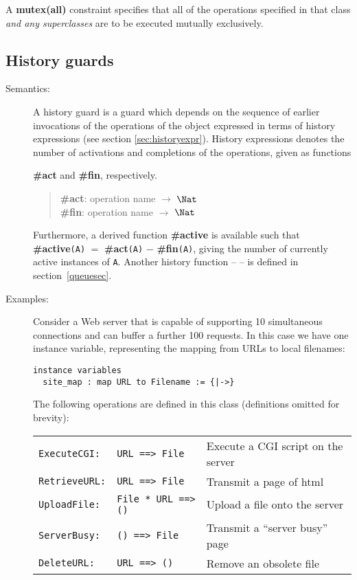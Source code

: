 \documentclass{overturerepchap}
\newcommand{\keyw}[1]{{\bf\ttfamily #1}}
\begin{document}
{\begin{description}
A \keyw{mutex(all)} constraint specifies that all of the operations
specified in that class \textit{and any superclasses} are to be
executed mutually exclusively.
\end{description}


\subsection{History guards}
\begin{description}
\item[Semantics:] A history guard is a guard which depends on the
sequence of earlier invocations of the operations of the object
expressed in terms of history expressions (see section
\ref{sec:historyexpr}). History expressions denotes the number
of activations and completions of the operations, given as functions

\keyw{\#act} and \keyw{\#fin}, respectively.
\begin{quote}
\keyw{\#act}: operation name $\rightarrow$ $\Nat$ \\
\keyw{\#fin}: operation name $\rightarrow$ $\Nat$
\end{quote}

Furthermore, a derived function {\bf\ttfamily \#active} is available such that
{\bf\ttfamily \#active}{\tt (A}{\tt )} $=$ {\bf\ttfamily \#act}{\tt (A}{\tt )} $-$
{\bf\ttfamily \#fin}{\tt (A}{\tt )}, giving the number of currently active
instances of {\tt A}. Another history function -- {\bf{}} -- is
defined in section~\ref{queuesec}.
\item[Examples:]
Consider a Web server\label{example:webserver} that is capable of
supporting 10 simultaneous
connections and can buffer a further 100 requests. In this case we
have one instance variable, representing the mapping from URLs to
local filenames:
\begin{lstlisting}
instance variables
  site_map : map URL to Filename := {|->}
\end{lstlisting}

The following operations are defined in this class (definitions
omitted for brevity):

\begin{tabular}{lll}
\texttt{ExecuteCGI:} & \texttt{URL ==> File} & Execute a CGI script on the server\\
\texttt{RetrieveURL:} & \texttt{URL ==> File} & Transmit a page of html\\
\texttt{UploadFile:} & \texttt{File * URL ==> ()} & Upload a file onto the server\\
\texttt{ServerBusy:} & \texttt{() ==> File} & Transmit a ``server busy'' page\\
\texttt{DeleteURL:} & \texttt{URL ==> ()} & Remove an obsolete file
\end{tabular}


\end{description}}
\end{document}

